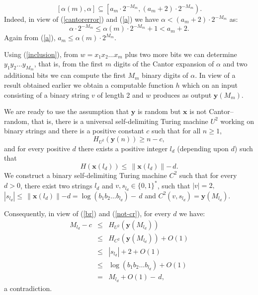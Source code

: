 \documentclass{elsart}
\begin{document}
\begin{equation}
\label{inclusion}
[\alpha(m), \alpha] \subseteq \left[a_{m}\cdot 2^{-M_{m}}, (a_{m}+2)\cdot
2^{-M_{m}}\right).
\end{equation}
Indeed, in view of (\ref{cantorerror})
and (\ref{a}) we have $\alpha < (a_{m}+2)\cdot 2^{-M_{m}}$ as:
\[\alpha \cdot 2^{-M_{m}} \le \alpha(m) \cdot 2^{-M_{m}} +1 < a_{m} +2. \]
Again from (\ref{a}), $ a_{m} \le \alpha(m)\cdot 2^{M_{m}}$.


Using (\ref{inclusion}),  from $w= x_1 x_2 \ldots x_m$ plus two more bits we
can determine $y_{1} y_{2} \ldots y_{M_{m}}$, that is, from the first $m$
digits of the Cantor expansion of $\alpha$ and two additional bits we can
compute the first $M_{m}$ binary digits of $\alpha$. In view of
a result obtained earlier
we obtain
a computable function $h$ which  on  an input consisting of a binary string
$v$ of length 2
and $w$  produces as output ${\mathbf y} (M_{m})$.

We are ready to use the assumption  that
${\mathbf y}$ is  random but ${\mathbf x}$ is not Cantor--random, that is, there is
  a universal self-delimiting Turing machine $U^{2}$ working
on binary strings and there is
 a positive constant $c$ such that for all $n\ge 1$,
\begin{equation}
\label{br}
H_{U^{2}} ({\mathbf y}(n)) \ge n-c,
\end{equation}
and
 for every positive $d$ there exists a positive integer $l_{d}$ (depending
upon $d$) such that
\begin{equation}
\label{not-cr}
H({\mathbf x}(l_{d})) \le \, \parallel {\mathbf x}(l_{d})
\parallel - \, d.
\end{equation}
We construct a binary self-delimiting Turing machine $C^{2}$
such that for every $d>0$, there exist two strings $l_{d}$ and $v,
s_{l_{d}}\in \{0,1\}^{*}$, such that $|v| = 2,$  $|s_{l_{d}}| \le
\,\parallel  {\mathbf x}(l_{d}) \parallel -d = \log (b_{1} b_{2}\ldots b_{l_{d}}) -\, d$
and $C^{2}(v, s_{l_{d}}) = {\mathbf y}(M_{l_{d}})$.

Consequently, in view of (\ref{br}) and (\ref{not-cr}),  for every $d$ we
have:
\begin{eqnarray*}
M_{l_{d}} -c & \le &  H_{U^{2}}({\mathbf y}(M_{l_{d}}))\\
& \le &  H_{C^{2}}({\mathbf y}(M_{l_{d}})) + O(1)\\
& \le & |s_{l_{d}}| + 2 + O(1)\\
& \le & \log (b_{1} b_{2}\ldots b_{l_{d}}) + O(1)\\
& = &  M_{l_{d}} + O(1) -  \,d,
\end{eqnarray*}
a contradiction.
\end{document}
